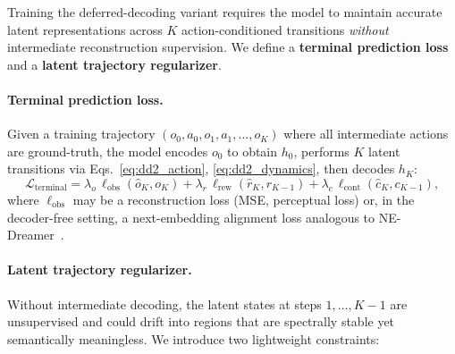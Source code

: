 Training the deferred-decoding variant requires the model to maintain accurate latent representations across $K$ action-conditioned transitions \emph{without} intermediate reconstruction supervision. We define a \textbf{terminal prediction loss} and a \textbf{latent trajectory regularizer}.

\paragraph{Terminal prediction loss.}
Given a training trajectory $(o_0, a_0, o_1, a_1, \ldots, o_K)$ where all intermediate actions are ground-truth, the model encodes $o_0$ to obtain $h_0$, performs $K$ latent transitions via Eqs.~\eqref{eq:dd2_action}, \eqref{eq:dd2_dynamics}, then decodes $h_K$:
\begin{equation}
  \mathcal{L}_{\mathrm{terminal}} =
    \lambda_o\,\ell_{\mathrm{obs}}(\hat{o}_K, o_K)
    + \lambda_r\,\ell_{\mathrm{rew}}(\hat{r}_K, r_{K-1})
    + \lambda_c\,\ell_{\mathrm{cont}}(\hat{c}_K, c_{K-1}),
  \label{eq:dd_loss_terminal}
\end{equation}
where $\ell_{\mathrm{obs}}$ may be a reconstruction loss (MSE, perceptual loss) or, in the decoder-free setting, a next-embedding alignment loss analogous to NE-Dreamer~\citep{anonymous2026nedreamer}.

\paragraph{Latent trajectory regularizer.}
Without intermediate decoding, the latent states at steps $1, \ldots, K-1$ are unsupervised and could drift into regions that are spectrally stable yet semantically meaningless.  We introduce two lightweight constraints:

